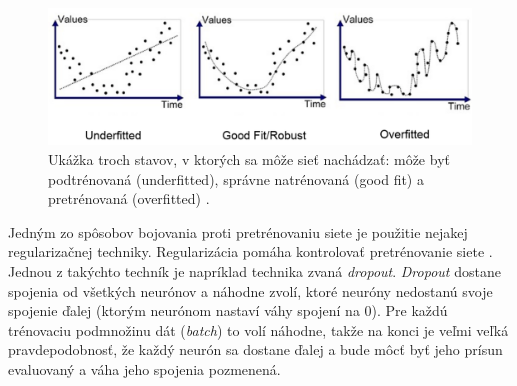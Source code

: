 \noindent
\begin{figure}
\includegraphics[width=\textwidth]{../img/overfit.png} 
\caption{Ukážka troch stavov, v ktorých sa môže sieť nachádzať: môže byť podtrénovaná (underfitted), správne natrénovaná (good fit) a pretrénovaná (overfitted) \citep{gitgud}.} 
\label{overf}
\end{figure}

Jedným zo spôsobov bojovania proti pretrénovaniu siete je použitie nejakej regularizačnej techniky. 
Regularizácia pomáha kontrolovať pretrénovanie siete \citep{overfit}.
Jednou z takýchto techník je napríklad technika zvaná \textit{dropout}.
\textit{Dropout} dostane spojenia od všetkých neurónov a náhodne zvolí, ktoré neuróny nedostanú svoje spojenie ďalej (ktorým neurónom nastaví váhy spojení na 0). Pre každú trénovaciu podmnožinu dát (\textit{batch}) to volí náhodne, takže na konci je veľmi veľká pravdepodobnosť, že každý neurón sa dostane ďalej a bude môcť byť jeho prísun evaluovaný a váha jeho spojenia pozmenená.